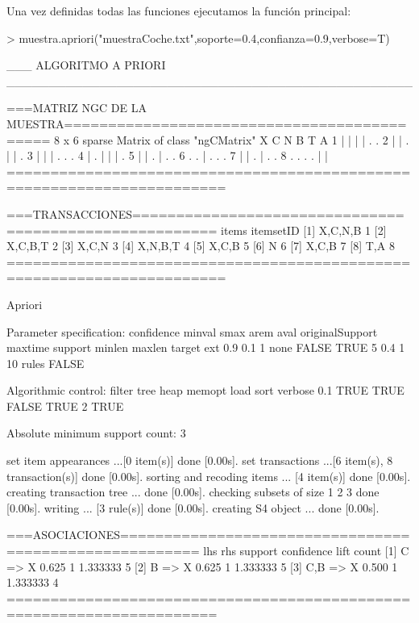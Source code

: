 \documentclass [a4paper] {article}
\begin{document}
Una vez definidas todas las funciones ejecutamos la función principal:
\begin{Schunk}
\begin{Sinput}
> muestra.apriori("muestraCoche.txt",soporte=0.4,confianza=0.9,verbose=T)
\end{Sinput}
\begin{Soutput}
___ ALGORITMO A PRIORI ________________________________________________

===MATRIZ NGC DE LA MUESTRA============================================
8 x 6 sparse Matrix of class "ngCMatrix"
  X C N B T A
1 | | | | . .
2 | | . | | .
3 | | | . . .
4 | . | | | .
5 | | . | . .
6 . . | . . .
7 | | . | . .
8 . . . . | |
=======================================================================

===TRANSACCIONES=======================================================
    items     itemsetID
[1] {X,C,N,B} 1        
[2] {X,C,B,T} 2        
[3] {X,C,N}   3        
[4] {X,N,B,T} 4        
[5] {X,C,B}   5        
[6] {N}       6        
[7] {X,C,B}   7        
[8] {T,A}     8        
=======================================================================

Apriori

Parameter specification:
 confidence minval smax arem  aval originalSupport maxtime support minlen maxlen target   ext
        0.9    0.1    1 none FALSE            TRUE       5     0.4      1     10  rules FALSE

Algorithmic control:
 filter tree heap memopt load sort verbose
    0.1 TRUE TRUE  FALSE TRUE    2    TRUE

Absolute minimum support count: 3 

set item appearances ...[0 item(s)] done [0.00s].
set transactions ...[6 item(s), 8 transaction(s)] done [0.00s].
sorting and recoding items ... [4 item(s)] done [0.00s].
creating transaction tree ... done [0.00s].
checking subsets of size 1 2 3 done [0.00s].
writing ... [3 rule(s)] done [0.00s].
creating S4 object  ... done [0.00s].

===ASOCIACIONES=======================================================
    lhs      rhs support confidence lift     count
[1] {C}   => {X} 0.625   1          1.333333 5    
[2] {B}   => {X} 0.625   1          1.333333 5    
[3] {C,B} => {X} 0.500   1          1.333333 4    
======================================================================
\end{Soutput}
\end{Schunk}
\end{document}
